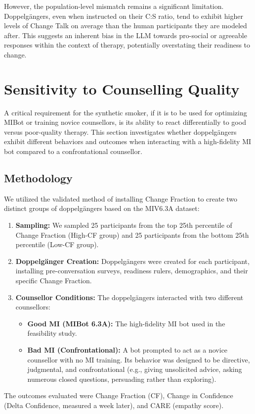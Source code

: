 However, the population-level mismatch remains a significant limitation. Doppelgängers, even when instructed on their C:S ratio, tend to exhibit higher levels of Change Talk on average than the human participants they are modeled after. This suggests an inherent bias in the LLM towards pro-social or agreeable responses within the context of therapy, potentially overstating their readiness to change.

\section{Sensitivity to Counselling Quality}

A critical requirement for the synthetic smoker, if it is to be used for optimizing MIBot or training novice counsellors, is its ability to react differentially to good versus poor-quality therapy. This section investigates whether doppelgängers exhibit different behaviors and outcomes when interacting with a high-fidelity MI bot compared to a confrontational counsellor.

\subsection{Methodology}

We utilized the validated method of installing Change Fraction to create two distinct groups of doppelgängers based on the MIV6.3A dataset:
\begin{enumerate}
    \item \textbf{Sampling:} We sampled 25 participants from the top 25th percentile of Change Fraction (High-CF group) and 25 participants from the bottom 25th percentile (Low-CF group).
    \item \textbf{Doppelgänger Creation:} Doppelgängers were created for each participant, installing pre-conversation surveys, readiness rulers, demographics, and their specific Change Fraction.
    \item \textbf{Counsellor Conditions:} The doppelgängers interacted with two different counsellors:
    \begin{itemize}
        \item \textbf{Good MI (MIBot 6.3A):} The high-fidelity MI bot used in the feasibility study.
        \item \textbf{Bad MI (Confrontational):} A bot prompted to act as a novice counsellor with no MI training. Its behavior was designed to be directive, judgmental, and confrontational (e.g., giving unsolicited advice, asking numerous closed questions, persuading rather than exploring).
    \end{itemize}
\end{enumerate}
The outcomes evaluated were Change Fraction (CF), Change in Confidence (Delta Confidence, measured a week later), and CARE (empathy score).

